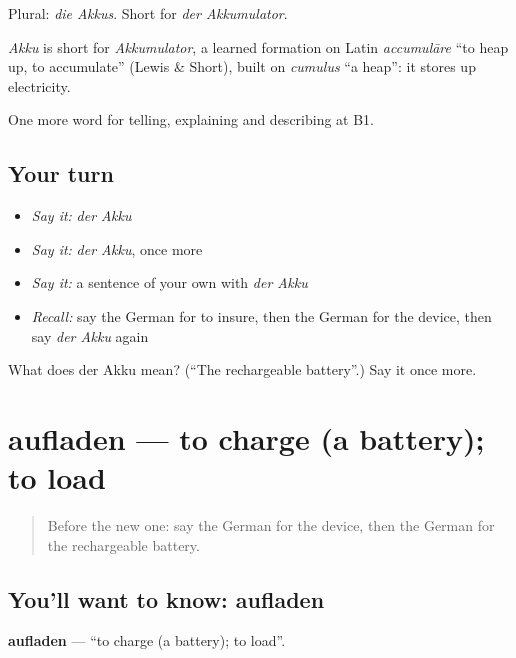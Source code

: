 Plural: \emph{die Akkus}. Short for \emph{der Akkumulator}.

\begin{cousinweb}
\emph{Akku} is short for \emph{Akkumulator}, a learned formation on Latin \emph{accumulāre} \textquotedblleft{}to heap up, to accumulate\textquotedblright{} (Lewis \& Short), built on \emph{cumulus} \textquotedblleft{}a heap\textquotedblright{}: it stores up electricity.
\end{cousinweb}

\begin{grammarlens}[title={What you've built}]
One more word for telling, explaining and describing at B1.
\end{grammarlens}

\subsection*{Your turn}
\begin{itemize}
\raggedright
  \item \emph{Say it:} \emph{der Akku}
  \item \emph{Say it:} \emph{der Akku}, once more
  \item \emph{Say it:} a sentence of your own with \emph{der Akku}
  \item \emph{Recall:} say the German for to insure, then the German for the device, then say \emph{der Akku} again
\end{itemize}

\begin{tcolorbox}[breakable,colback=teal!4,colframe=teal!35!black,title={Before you move on}]
What does der Akku mean? (\textquotedblleft{}The rechargeable battery\textquotedblright{}.) Say it once more.
\end{tcolorbox}
\section[aufladen]{aufladen — to charge (a battery); to load}

\label{lesson:GE-C392-aufladen}



\begin{quote}
Before the new one: say the German for the device, then the German for the rechargeable battery.
\end{quote}

\subsection*{You'll want to know: aufladen}
\textbf{aufladen} — \textquotedblleft{}to charge (a battery); to load\textquotedblright{}.

